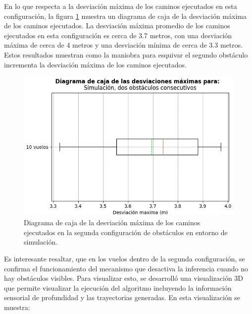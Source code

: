 En lo que respecta a la desviación máxima de los caminos ejecutados en esta configuración, la figura \ref{fig:double-max-deviation} muestra un diagrama de caja de la desviación máxima de los caminos ejecutados. La desviación máxima promedio de los caminos ejecutados en esta configuración es cerca de 3.7 metros, con una desviación máxima de cerca de 4 metros y una desviación mínima de cerca de 3.3 metros. Estos resultados muestran como la maniobra para esquivar el segundo obstáculo incrementa la desviación máxima de los caminos ejecutados.

\begin{figure}[H]
    \centering
    \includegraphics[scale=0.55]{partes/img/sim-double-panel-box.png}
    \caption[Diagrama de caja de la desviación máxima de los caminos ejecutados en la segunda configuración de obstáculos en entorno de simulación.]{Diagrama de caja de la desviación máxima de los caminos ejecutados en la segunda configuración de obstáculos en entorno de simulación.}
    \label{fig:double-max-deviation}
\end{figure}

Es interesante resaltar, que en los vuelos dentro de la segunda configuración, se confirma el funcionamiento del mecanismo que desactiva la inferencia cuando no hay obstáculos visibles. Para visualizar esto, se desarrolló una visualización 3D que permite visualizar la ejecución del algoritmo incluyendo la información sensorial de profundidad y las trayectorias generadas. En esta visualización se muestra:

